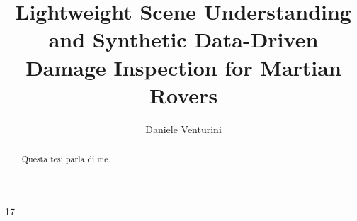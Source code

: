 \documentclass[binding=0.6cm]{sapthesis}
\title{Lightweight Scene Understanding and Synthetic Data-Driven Damage Inspection for Martian Rovers}
\author{Daniele Venturini}
\begin{document}
\frontmatter
\maketitle
\dedication{Dedicato a\\ me}

\raggedbottom

\begin{abstract}
	Questa tesi parla di me.
\end{abstract}

\tableofcontents

\mainmatter









\backmatter
\cleardoublepage
{} %

\begin{thebibliography}{17}
	
\end{thebibliography}
\end{document}
